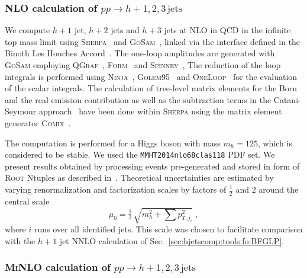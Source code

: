 \subsubsection{NLO calculation of $pp\to h+1,2,3\,\text{jets}$}
\label{sec:hjetscomp:tools:fo:hnj}

We compute $h+1$ jet, $h+2$ jets and
$h+3$ jets at NLO in QCD in the infinite top mass limit
using \textsc{Sherpa}~\cite{Gleisberg:2008ta} and
\textsc{GoSam}~\cite{Cullen:2011ac,Cullen:2014yla}, linked via the
interface defined in the Binoth Les Houches
Accord~\cite{Binoth:2010xt,Alioli:2013nda}.
The one-loop amplitudes are generated with \textsc{GoSam} employing
\textsc{QGraf}~\cite{Nogueira:1991ex},
\textsc{Form}~\cite{Vermaseren:2000nd,Kuipers:2012rf} and
\textsc{Spinney}~\cite{Cullen:2010jv}, The reduction of the loop
integrals is performed using
\textsc{Ninja}~\cite{Mastrolia:2012bu,vanDeurzen:2013saa,Peraro:2014cba},
\textsc{Golem95}~\cite{Heinrich:2010ax,Binoth:2008uq,Cullen:2011kv}
and \textsc{OneLoop}~\cite{vanHameren:2010cp} for the evaluation of
the scalar integrals.
The calculation of tree-level matrix elements for the Born and the
real emission contribution as well as the subtraction terms in the
Catani-Seymour approach~\cite{Catani:1996vz} have been done within
\textsc{Sherpa} using the matrix element generator
\textsc{Comix}~\cite{Gleisberg:2008fv}.

The computation is performed for a Higgs boson with mass
$m_h=125$, which is considered to be stable. We used the 
\texttt{MMHT2014nlo68clas118} PDF set. We present results 
obtained by processing events pre-generated and
stored in form of \textsc{Root} Ntuples as described
in~\cite{Bern:2013zja}. Theoretical
uncertainties are estimated by varying renormalization and
factorization scales by factors of $\tfrac{1}{2}$ and $2$ 
around the central scale
\begin{equation}
  \mu_0 = \tfrac{1}{2}\,\sqrt{m_{h}^2+\sum p_{T,j_i}^2}\;,
\end{equation}
where $i$ runs over all identified jets.
This scale was chosen to facilitate comparison with the $h+1$ jet NNLO 
calculation of Sec.\ \ref{sec:hjetscomp:tools:fo:BFGLP}.



\subsubsection{\textsc{MiNLO} calculation of $pp\to h+1,2,3\,\text{jets}$}
\label{sec:hjetscomp:tools:fo:hnjminlo}

